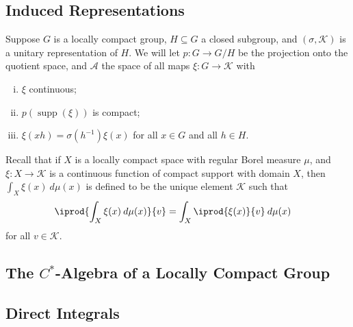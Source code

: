 \documentclass[10pt]{mypackage}
\begin{document}
\subsection{Induced Representations}%
Suppose $G$ is a locally compact group, $H\subseteq G$ a closed subgroup, and $\left( \sigma,\mathscr{K} \right)$ is a unitary representation of $H$. We will let $p\colon G\to G/H$ be the projection onto the quotient space, and $\mathscr{A}$ the space of all maps $\xi\colon G\to \mathscr{K}$ with
\begin{enumerate}[(i)]
  \item $\xi$ continuous;
  \item $p\left( \operatorname{supp}\left( \xi \right) \right)$ is compact;
  \item $\xi\left( xh \right) = \sigma\left( h^{-1} \right)\xi\left( x \right)$ for all $x\in G$ and all $h\in H$.
\end{enumerate}
Recall that if $X$ is a locally compact space with regular Borel measure $\mu$, and $\xi\colon X\to \mathscr{K}$ is a continuous function of compact support with domain $X$, then $ \int_{X}^{} \xi(x)\:d\mu(x) $ is defined to be the unique element $\mathscr{K}$ such that
\begin{align*}
  \iprod{\int_{X}^{} \xi(x)\:d\mu(x)}{v} &= \int_{X}^{} \iprod{\xi(x)}{v}\:d\mu(x)
\end{align*}
for all $v\in \mathscr{K}$.
\subsection{The $C^{\ast}$-Algebra of a Locally Compact Group}%
\subsection{Direct Integrals}%

\nocite{kazhdan_property_t,conway_functional_analysis,bekka_delaharpe,kerr_and_li}
\printbibliography
\end{document}
